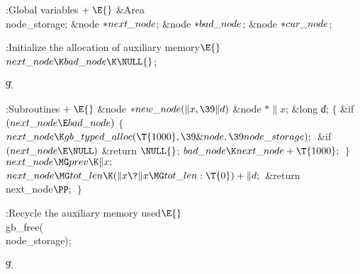 \B{}:Global variables\X${}\mathrel+\E{}$\6
\&{Area} \\{node\_storage};\6
\&{node} ${}{*}\\{next\_node}{}$;\6
\&{node} ${}{*}\\{bad\_node}{}$;\6
\&{node} ${}{*}\\{cur\_node}{}$;\par
\fi

\B{}:Initialize the allocation of auxiliary memory\X${}\E{}$\6
$\\{next\_node}\K\\{bad\_node}\K\NULL{}$;\par
\U9.\fi

\B{}:Subroutines\X${}\mathrel+\E{}$\6
\1\1\&{node} ${}{*}\\{new\_node}(\|x,\39\|d){}$\6
\&{node} ${}{*}\|x{}$;\6
\&{long} \|d;\2\2\6
${}\{{}$\1\6
\&{if} ${}(\\{next\_node}\E\\{bad\_node}){}$\5
${}\{{}$\1\6
${}\\{next\_node}\K\\{gb\_typed\_alloc}(\T{1000},\39\&{node},\39\\{node%
\_storage});{}$\6
\&{if} ${}(\\{next\_node}\E\NULL){}$\1\5
\&{return} ${}\NULL{}$;\2\6
${}\\{bad\_node}\K\\{next\_node}+\T{1000};{}$\6
\4${}\}{}$\2\6
${}\\{next\_node}\MG\\{prev}\K\|x;{}$\6
${}\\{next\_node}\MG\\{tot\_len}\K(\|x\?\|x\MG\\{tot\_len}:\T{0})+\|d;{}$\6
\&{return} \\{next\_node}${}\PP;{}$\6
\4${}\}{}$\2\par
\fi

\B{}:Recycle the auxiliary memory used\X${}\E{}$\6
\\{gb\_free}(\\{node\_storage});\par
\U9.\fi

